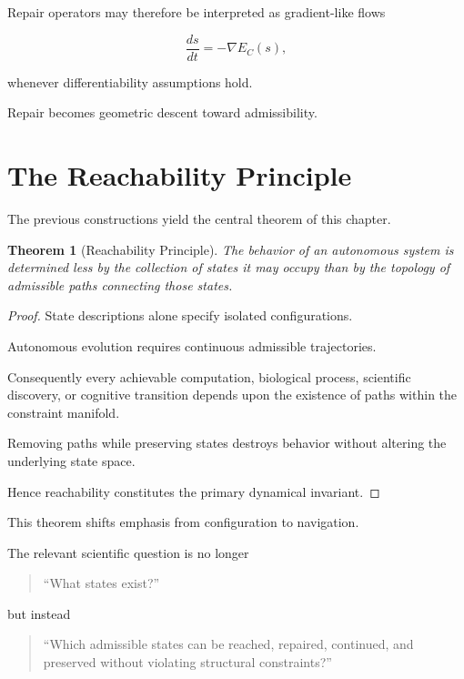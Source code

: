 \documentclass[11pt,oneside]{book}
\numberwithin{equation}{chapter}
\theoremstyle{definition}
\theoremstyle{plain}
\newtheorem{theorem}[definition]{Theorem}
\begin{document}
Repair operators may therefore be interpreted as gradient-like flows

\[
\frac{ds}{dt}
=
-
\nabla
E_C(s),
\]

whenever differentiability assumptions hold.

Repair becomes geometric descent toward admissibility.

\section{The Reachability Principle}

The previous constructions yield the central theorem of this chapter.

\begin{theorem}[Reachability Principle]

The behavior of an autonomous system is determined less by the collection of
states it may occupy than by the topology of admissible paths connecting
those states.

\end{theorem}

\begin{proof}

State descriptions alone specify isolated configurations.

Autonomous evolution requires continuous admissible trajectories.

Consequently every achievable computation, biological process, scientific
discovery, or cognitive transition depends upon the existence of paths within
the constraint manifold.

Removing paths while preserving states destroys behavior without altering the
underlying state space.

Hence reachability constitutes the primary dynamical invariant.

\end{proof}

This theorem shifts emphasis from configuration to navigation.

The relevant scientific question is no longer

\begin{quote}
``What states exist?''
\end{quote}

but instead

\begin{quote}
``Which admissible states can be reached, repaired, continued, and preserved
without violating structural constraints?''
\end{quote}
\end{document}
